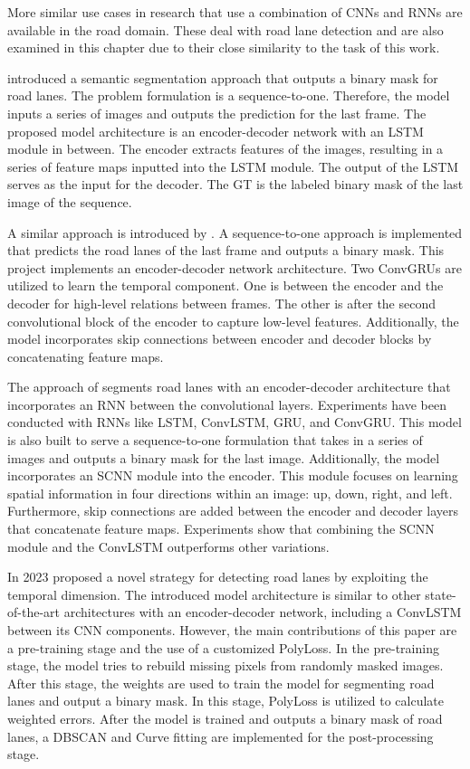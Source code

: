 More similar use cases in research that use a combination of \ac{CNN}s and \ac{RNN}s are available in the road domain.
These deal with road lane detection and are also examined in this chapter due to their close similarity to the task of this work.

\cite{robustLaneDetection2020} introduced a semantic segmentation approach that outputs a binary mask for road lanes.
The problem formulation is a sequence-to-one.
Therefore, the model inputs a series of images and outputs the prediction for the last frame.
The proposed model architecture is an encoder-decoder network with an \ac{LSTM} module in between.
The encoder extracts features of the images, resulting in a series of feature maps inputted into the \ac{LSTM} module.
The output of the \ac{LSTM} serves as the input for the decoder.
The \ac{GT} is the labeled binary mask of the last image of the sequence.

A similar approach is introduced by \cite{CNNGRU2022}.
A sequence-to-one approach is implemented that predicts the road lanes of the last frame and outputs a binary mask.
This project implements an encoder-decoder network architecture.
Two ConvGRUs are utilized to learn the temporal component.
One is between the encoder and the decoder for high-level relations between frames.
The other is after the second convolutional block of the encoder to capture low-level features.
Additionally, the model incorporates skip connections between encoder and decoder blocks by concatenating feature maps.

The approach of \cite{hybridSTLanedetction2023} segments road lanes with an encoder-decoder architecture that incorporates an \ac{RNN} between the convolutional layers.
Experiments have been conducted with \ac{RNN}s like \ac{LSTM}, ConvLSTM, \ac{GRU}, and ConvGRU.
This model is also built to serve a sequence-to-one formulation that takes in a series of images and outputs a binary mask for the last image.
Additionally, the model incorporates an SCNN module into the encoder.
This module focuses on learning spatial information in four directions within an image: up, down, right, and left. Furthermore, skip connections are added between the encoder and decoder layers that concatenate feature maps.
Experiments show that combining the SCNN module and the ConvLSTM outperforms other variations.

In 2023 \cite{robustLaneDetection2023} proposed a novel strategy for detecting road lanes by exploiting the temporal dimension.
The introduced model architecture is similar to other state-of-the-art architectures with an encoder-decoder network, including a ConvLSTM between its \ac{CNN} components.
However, the main contributions of this paper are a pre-training stage and the use of a customized PolyLoss.
In the pre-training stage, the model tries to rebuild missing pixels from randomly masked images.
After this stage, the weights are used to train the model for segmenting road lanes and output a binary mask.
In this stage, PolyLoss is utilized to calculate weighted errors.
After the model is trained and outputs a binary mask of road lanes, a DBSCAN and Curve fitting are implemented for the post-processing stage.


